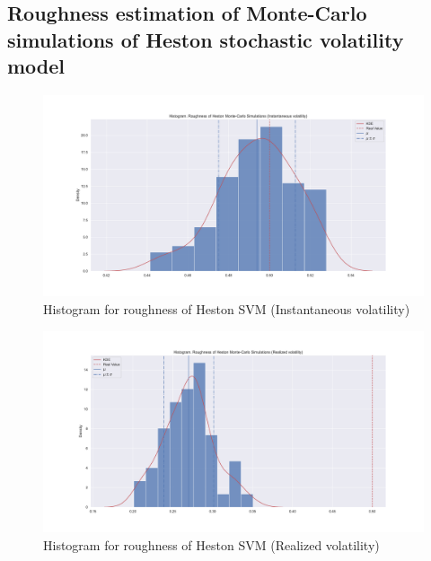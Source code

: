         \subsection{Roughness estimation of Monte-Carlo simulations of Heston stochastic volatility model}
            \begin{frame}{}
                \begin{figure}[htbp]
                    \centering
                    \includegraphics[width=0.9\linewidth]{fig/Histogram. Roughness of Heston Monte-Carlo Simulations (Instantaneous volatility).pdf}
                    \caption{Histogram for roughness of Heston SVM (Instantaneous volatility)}
                \end{figure}
            \end{frame}

            \begin{frame}{}
                \begin{figure}[htbp]
                    \centering
                    \includegraphics[width=0.9\linewidth]{fig/Histogram. Roughness of Heston Monte-Carlo Simulations (Realized volatility).pdf}
                    \caption{Histogram for roughness of Heston SVM (Realized volatility)}
                \end{figure}
            \end{frame}

